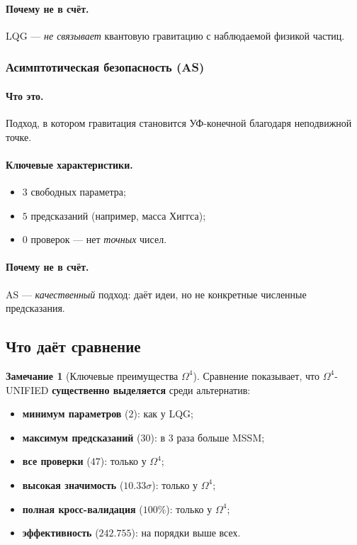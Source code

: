 \documentclass[11pt,a4paper]{article}
\newcommand{\Om}{\Omega^4}
\theoremstyle{definition}
\newtheorem{remark}[theorem]{Замечание}
\begin{document}
\paragraph{Почему не в счёт.}
LQG — \emph{не связывает} квантовую гравитацию 
с наблюдаемой физикой частиц.

\subsubsection{Асимптотическая безопасность (AS)}

\paragraph{Что это.} 
Подход, в котором гравитация становится 
УФ-конечной благодаря неподвижной точке.

\paragraph{Ключевые характеристики.}
\begin{itemize}
    \item $3$ свободных параметра;
    \item $5$ предсказаний (например, масса Хиггса);
    \item $0$ проверок — нет \emph{точных} чисел.
\end{itemize}

\paragraph{Почему не в счёт.}
AS — \emph{качественный} подход: даёт идеи, 
но не конкретные численные предсказания.

\subsection{Что даёт сравнение}
\label{subsec:benchmark-what-gives}

\begin{remark}[Ключевые преимущества $\Om$]
\label{rem:benchmark-advantages}
Сравнение показывает, что $\Om$-UNIFIED \textbf{существенно 
выделяется} среди альтернатив:
\begin{itemize}
    \item \textbf{минимум параметров} ($2$): как у LQG;
    \item \textbf{максимум предсказаний} ($30$): в 3 раза больше 
          MSSM;
    \item \textbf{все проверки} ($47$): только у $\Om$;
    \item \textbf{высокая значимость} ($10.33\sigma$): только 
          у $\Om$;
    \item \textbf{полная кросс-валидация} ($100\%$): только 
          у $\Om$;
    \item \textbf{эффективность} ($242.755$): на порядки выше всех.
\end{itemize}
\end{remark}
\end{document}
